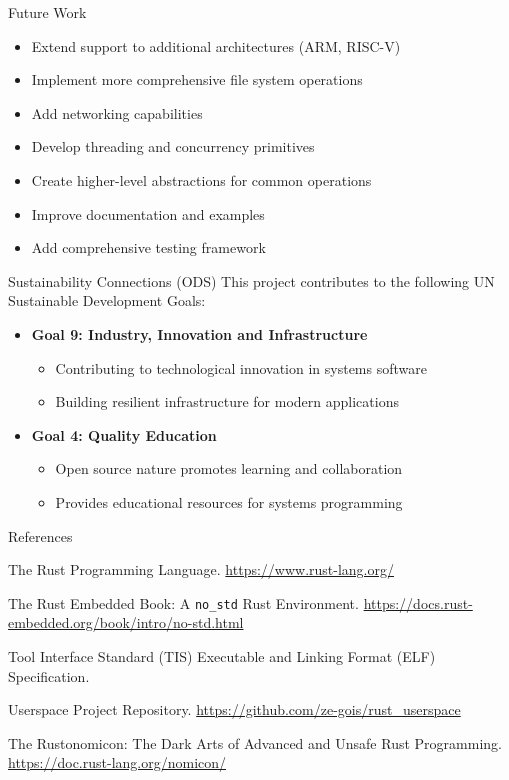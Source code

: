 \documentclass{beamer}
\begin{document}
\begin{frame}{Future Work}
  \begin{itemize}
    \item Extend support to additional architectures (ARM, RISC-V)
    \item Implement more comprehensive file system operations
    \item Add networking capabilities
    \item Develop threading and concurrency primitives
    \item Create higher-level abstractions for common operations
    \item Improve documentation and examples
    \item Add comprehensive testing framework
  \end{itemize}
\end{frame}

\begin{frame}{Sustainability Connections (ODS)}
  This project contributes to the following UN Sustainable Development Goals:
  \begin{itemize}
    \item \textbf{Goal 9: Industry, Innovation and Infrastructure}
      \begin{itemize}
        \item Contributing to technological innovation in systems software
        \item Building resilient infrastructure for modern applications
      \end{itemize}
    \item \textbf{Goal 4: Quality Education}
      \begin{itemize}
        \item Open source nature promotes learning and collaboration
        \item Provides educational resources for systems programming
      \end{itemize}
  \end{itemize}
\end{frame}

\begin{frame}{References}
  \begin{thebibliography}{9}
     The Rust Programming Language. \url{https://www.rust-lang.org/}

     The Rust Embedded Book: A \texttt{no\_std} Rust Environment. \url{https://docs.rust-embedded.org/book/intro/no-std.html}

     Tool Interface Standard (TIS) Executable and Linking Format (ELF) Specification.

     Userspace Project Repository. \url{https://github.com/ze-gois/rust_userspace}

     The Rustonomicon: The Dark Arts of Advanced and Unsafe Rust Programming. \url{https://doc.rust-lang.org/nomicon/}
  \end{thebibliography}
\end{frame}
\end{document}
